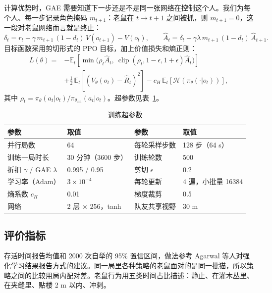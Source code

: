 \documentclass[a4paper,zihao=5,fontset=fandol,UTF8]{ctexart}
\begin{document}
计算优势时，GAE 需要知道下一步还是不是同一张网络在控制这个人。我们为每个人、每一步记录角色掩码 $m_{t+1}$：老鼠在 $t\to t+1$ 之间被抓，则 $m_{t+1}=0$，这一段对老鼠网络而言就是终止：
\begin{equation}
\delta_t = r_t + \gamma\, m_{t+1}\,(1-d_t)\, V(o_{t+1}) - V(o_t),\qquad
\hat A_t = \delta_t + \gamma\lambda\, m_{t+1}\,(1-d_t)\,\hat A_{t+1}.
\end{equation}
目标函数采用剪切形式的 PPO 目标，加上价值损失和熵正则：
\begin{equation}
\begin{aligned}
L(\theta)={}&-\mathbb{E}_t\!\left[\min\!\big(\rho_t\hat A_t,\ \operatorname{clip}(\rho_t,1-\epsilon,1+\epsilon)\hat A_t\big)\right]\\
&+\tfrac12\,\mathbb{E}_t\!\left[(V_\theta(o_t)-\hat R_t)^2\right]-c_H\,\mathbb{E}_t\!\left[\mathcal H(\pi_\theta(\cdot|o_t))\right],
\end{aligned}
\end{equation}
其中 $\rho_t=\pi_\theta(a_t|o_t)/\pi_{\theta_{\text{old}}}(a_t|o_t)$。超参数见表~\ref{tab:hp}。

\begin{table}[htbp]
  \centering\small
  \caption{训练超参数}
  \label{tab:hp}
  \begin{tabular}{@{}ll@{\qquad}ll@{}}
    \toprule
    参数 & 取值 & 参数 & 取值\\
    \midrule
    并行局数 & 64 & 每轮采样步数 & 128 步（64 s）\\
    训练一局时长 & 30 分钟（3600 步） & 训练轮数 & 500\\
    折扣 $\gamma$ / GAE $\lambda$ & 0.995 / 0.95 & 剪切 $\epsilon$ & 0.2\\
    学习率（Adam） & $3\times10^{-4}$ & 每轮更新 & 4 遍，小批量 16384\\
    熵系数 $c_H$ & 0.01 & 梯度裁剪 & 0.5\\
    网络 & 2 层 × 256，tanh & 队友共享视野 & 30 m\\
    \bottomrule
  \end{tabular}
\end{table}

\subsection{评价指标}
存活时间报告均值和 2000 次自举的 95\% 置信区间，做法参考 Agarwal 等人对强化学习结果报告方式的建议\cite{agarwal2021}。同一局里各种策略的老鼠面对的是同一批猫，所以策略之间的比较用局内配对差。老鼠行为用五类时间占比描述：静止、在灌木丛里、在夹缝里、贴楼 2 m 以内、冲刺。
\end{document}
